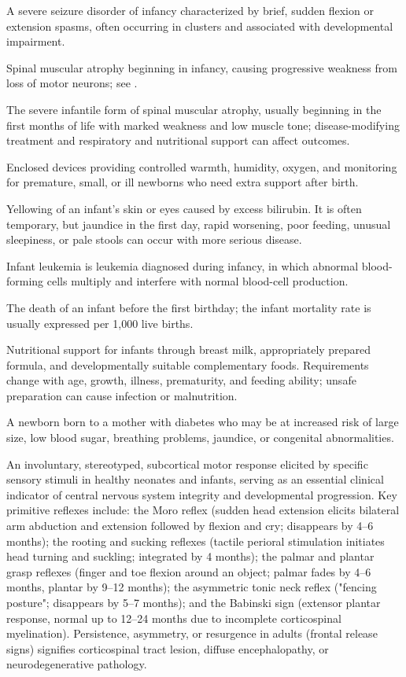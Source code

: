  A severe seizure disorder of infancy characterized by brief, sudden flexion or extension spasms, often occurring in clusters and associated with developmental impairment.

 Spinal muscular atrophy beginning in infancy, causing progressive weakness from loss of motor neurons; see .

 The severe infantile form of spinal muscular atrophy, usually beginning in the first months of life with marked weakness and low muscle tone; disease-modifying treatment and respiratory and nutritional support can affect outcomes.

 Enclosed devices providing controlled warmth, humidity, oxygen, and monitoring for premature, small, or ill newborns who need extra support after birth.

 Yellowing of an infant’s skin or eyes caused by excess bilirubin. It is often temporary, but jaundice in the first day, rapid worsening, poor feeding, unusual sleepiness, or pale stools can occur with more serious disease.

 Infant leukemia is leukemia diagnosed during infancy, in which abnormal blood-forming cells multiply and interfere with normal blood-cell production.

 The death of an infant before the first birthday; the infant mortality rate is usually expressed per 1,000 live births.

 Nutritional support for infants through breast milk, appropriately prepared formula, and developmentally suitable complementary foods. Requirements change with age, growth, illness, prematurity, and feeding ability; unsafe preparation can cause infection or malnutrition.

 A newborn born to a mother with diabetes who may be at increased risk of large size, low blood sugar, breathing problems, jaundice, or congenital abnormalities.

 An involuntary, stereotyped, subcortical motor response elicited by specific sensory stimuli in healthy neonates and infants, serving as an essential clinical indicator of central nervous system integrity and developmental progression. Key primitive reflexes include: the Moro reflex (sudden head extension elicits bilateral arm abduction and extension followed by flexion and cry; disappears by 4--6 months); the rooting and sucking reflexes (tactile perioral stimulation initiates head turning and suckling; integrated by 4 months); the palmar and plantar grasp reflexes (finger and toe flexion around an object; palmar fades by 4--6 months, plantar by 9--12 months); the asymmetric tonic neck reflex ("fencing posture"; disappears by 5--7 months); and the Babinski sign (extensor plantar response, normal up to 12--24 months due to incomplete corticospinal myelination). Persistence, asymmetry, or resurgence in adults (frontal release signs) signifies corticospinal tract lesion, diffuse encephalopathy, or neurodegenerative pathology.

